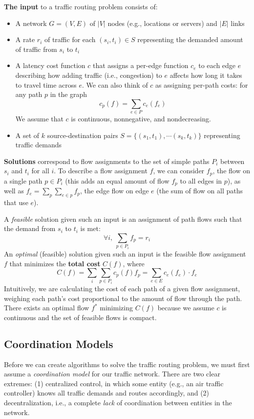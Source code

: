 \documentclass[acmlarge]{acmart}
\begin{document}
\medskip\noindent
\textbf{The input} to a traffic routing problem consists of:
\begin{itemize}
    \item A network $G = (V, E)$ of $|V|$ nodes (e.g., locations or servers) and $|E|$ links 
    \item A {rate} $r_i$ of traffic for each $(s_i,t_i)\in S$ representing the demanded amount of traffic from $s_i$ to $t_i$
    \item A {latency} cost function $c$ that assigns a per-edge function $c_e$ to each edge $e$ describing how adding traffic (i.e., congestion) to $e$ affects how long it takes to travel time across $e$. We can also think of $c$ as assigning per-path costs: for any path $p$ in the graph
        $$c_p(f) = \sum_{e\in P}c_e(f_e)$$ 
        We assume that $c$ is continuous, nonnegative, and nondecreasing.
    \item A set of $k$ source-destination pairs $S=\{(s_1,t_1), \cdots (s_k,t_k)\}$ representing traffic demands
\end{itemize}

\medskip\noindent
\textbf{Solutions} correspond to flow assignments to the set of simple paths $P_i$ between $s_i$ and $t_i$ for all $i$. To describe a flow assignment $f$, we can consider $f_p$, the flow on a single path $p \in P_i$ (this adds an equal amount of flow $f_p$ to all edges in $p$), as well as $f_e = \sum_p \sum_{e\in p} f_p$, the edge flow on edge $e$ (the sum of flow on all paths that use $e$).

   A \emph{feasible} solution given such an input is an assignment of path flows such that the demand from $s_i$ to $t_i$ is met:
$$\forall i,~\sum_{p\in P_i} f_p = r_i$$
   An \emph{optimal} (feasible) solution given such an input is the feasible flow assignment $f$ that minimizes the \textbf{total cost} $C(f)$, where
$$C(f) = \sum_i\sum_{p\in P_i}c_p(f)f_p = \sum_{e\in E} c_e(f_e)\cdot f_e$$
Intuitively, we are calculating the cost of each path of a given flow assignment, weighing 
each path's cost proportional to the amount of flow through the path.
There exists an optimal flow $f^*$ minimizing $C(f)$ because we assume $c$ is continuous and the set of feasible flows is compact.

\subsection{Coordination Models}
Before we can create algorithms to solve the traffic routing problem, we must first assume a \emph{coordination model} for our traffic network.
There are two clear extremes: (1) centralized control, in which some entity (e.g., an air traffic controller) knows all traffic demands and routes accordingly, and
(2) decentralization, i.e., a complete \emph{lack} of coordination between
entities in the network.
\end{document}
